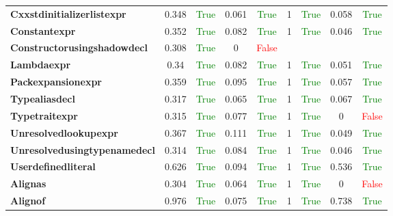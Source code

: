 \documentclass{article}
\begin{document}
\begin{xltabular}{\textwidth}{lcccccccc}
\textbf{{\fontsize{10}{12}\selectfont Cxxstdinitializerlistexpr}}& 0.348&\textcolor{green}{True}& 0.061&\textcolor{green}{True}& 1&\textcolor{green}{True}& 0.058&\textcolor{green}{True} \\[0.5ex]
\textbf{{\fontsize{10}{12}\selectfont Constantexpr}}& 0.352&\textcolor{green}{True}& 0.082&\textcolor{green}{True}& 1&\textcolor{green}{True}& 0.046&\textcolor{green}{True} \\[0.5ex]
\textbf{{\fontsize{10}{12}\selectfont Constructorusingshadowdecl}}& 0.308&\textcolor{green}{True}& 0&\textcolor{red}{False} \\[0.5ex]
\textbf{{\fontsize{10}{12}\selectfont Lambdaexpr}}& 0.34&\textcolor{green}{True}& 0.082&\textcolor{green}{True}& 1&\textcolor{green}{True}& 0.051&\textcolor{green}{True} \\[0.5ex]
\textbf{{\fontsize{10}{12}\selectfont Packexpansionexpr}}& 0.359&\textcolor{green}{True}& 0.095&\textcolor{green}{True}& 1&\textcolor{green}{True}& 0.057&\textcolor{green}{True} \\[0.5ex]
\textbf{{\fontsize{10}{12}\selectfont Typealiasdecl}}& 0.317&\textcolor{green}{True}& 0.065&\textcolor{green}{True}& 1&\textcolor{green}{True}& 0.067&\textcolor{green}{True} \\[0.5ex]
\textbf{{\fontsize{10}{12}\selectfont Typetraitexpr}}& 0.315&\textcolor{green}{True}& 0.077&\textcolor{green}{True}& 1&\textcolor{green}{True}& 0&\textcolor{red}{False} \\[0.5ex]
\textbf{{\fontsize{10}{12}\selectfont Unresolvedlookupexpr}}& 0.367&\textcolor{green}{True}& 0.111&\textcolor{green}{True}& 1&\textcolor{green}{True}& 0.049&\textcolor{green}{True} \\[0.5ex]
\textbf{{\fontsize{10}{12}\selectfont Unresolvedusingtypenamedecl}}& 0.314&\textcolor{green}{True}& 0.084&\textcolor{green}{True}& 1&\textcolor{green}{True}& 0.046&\textcolor{green}{True} \\[0.5ex]
\textbf{{\fontsize{10}{12}\selectfont Userdefinedliteral}}& 0.626&\textcolor{green}{True}& 0.094&\textcolor{green}{True}& 1&\textcolor{green}{True}& 0.536&\textcolor{green}{True} \\[0.5ex]
\textbf{{\fontsize{10}{12}\selectfont Alignas}}& 0.304&\textcolor{green}{True}& 0.064&\textcolor{green}{True}& 1&\textcolor{green}{True}& 0&\textcolor{red}{False} \\[0.5ex]
\textbf{{\fontsize{10}{12}\selectfont Alignof}}& 0.976&\textcolor{green}{True}& 0.075&\textcolor{green}{True}& 1&\textcolor{green}{True}& 0.738&\textcolor{green}{True} \\[0.5ex]

\end{xltabular}
\end{document}
